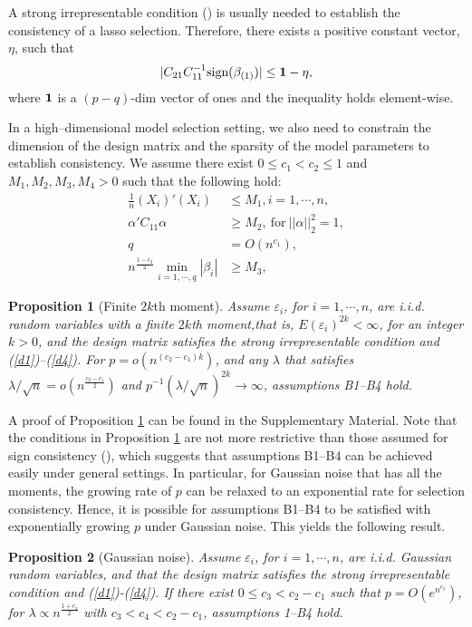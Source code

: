 \documentclass[12pt]{article} %
\newtheorem{proposition}{Proposition}
\theoremstyle{definition}
\begin{document}
A strong irrepresentable condition (\citet{Zhao2006}) is usually needed to establish the consistency of a lasso selection. Therefore, there exists a positive constant vector, $\eta$, such that
\begin{eqnarray}
   |C_{21}C_{11}^{-1}\text{sign}(\beta_{(1)})|\leq {\bf 1}-\eta,
\end{eqnarray}
where ${\bf 1}$ is a $(p-q)$-dim vector of ones and the inequality holds element-wise.

In a high–dimensional model selection setting, we also need to constrain the dimension of the design matrix and the sparsity of the model parameters to establish consistency. We assume there exist $0 \leq c_1 < c_2 \leq1$ and $M_1, M_2, M_3, M_4 > 0$ such that the following hold:
\begin{align}
    \frac{1}{n}(X_i)'(X_i) &\leq M_1, i=1,\cdots,n, \label{d1}\\
    \alpha'C_{11}\alpha&\geq M_2, \ \text{for} \ ||\alpha||_2^2=1, \label{d2}\\
    q&=O(n^{c_1}),\label{d3}\\
    n^{\frac{1-c_2}{2}}\min_{i=1,\cdots, q}|\beta_i|&\geq M_3,\label{d4}
\end{align}

 \begin{proposition}[Finite $2k$th moment]
 \label{th:2k}
 Assume $\varepsilon_i$, for $i=1,\cdots, n$, are i.i.d. random variables with a finite $2k$th moment,that is, $E(\varepsilon_i)^{2k}<\infty$, for an integer $k>0$, and the design matrix satisfies the strong irrepresentable condition and (\ref{d1})–(\ref{d4}). For $p=o(n^{(c_2-c_1)k})$, and any $\lambda$ that satisfies $\lambda/\sqrt{n} =o( n^{\frac{c_2-c_1}{2}})$ and $p^{-1}(\lambda/\sqrt{n})^{2k}\rightarrow \infty$, assumptions {\it B1–B4} hold.
 \end{proposition}
A proof of Proposition \ref{th:2k} can be found in the Supplementary Material. Note that the conditions in Proposition \ref{th:2k} are not more restrictive than those assumed for sign consistency (\citet{Zhao2006}), which suggests that assumptions B1–B4 can be achieved easily under general settings. In particular, for Gaussian noise that has all the moments, the growing rate of $p$ can be relaxed to an exponential rate for selection consistency. Hence, it is possible for assumptions  B1–B4 to be satisfied with exponentially growing $p$ under Gaussian noise. This yields the following result.
 
\begin{proposition}[Gaussian noise]
Assume $\varepsilon_i$, for $i=1,\cdots, n$, are i.i.d. Gaussian random variables, and that the design matrix satisfies the strong irrepresentable condition and (\ref{d1})-(\ref{d4}). If there exist $0 \leq c_3 <c_2-c_1$ such that $p=O(e^{n^{c_3}})$, for $\lambda \propto n^{\frac{1+c_4}{2}}$ with $c_3<c_4<c_2-c_1$, assumptions 1–B4 hold.
\end{proposition}
\end{document}
